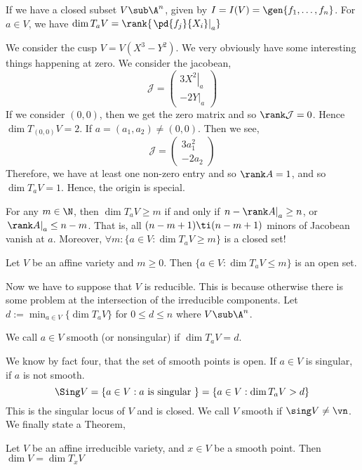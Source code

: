 \begin{fact}
  If we have a closed subset $V \sub \A^n$, given by $I = I(V) = \gen{f_1, \dots, f_n}$. For $a \in V$, we have $\dim T_aV = \rank{\left.\pd {f_j}{X_i}\right|_a}$
\end{fact}
We consider the cusp $V = V(X^3 - Y^2)$. We very obviously have some interesting things happening at zero. We consider the jacobean,
$$ \mathcal{J} = \begin{pmatrix}
  \left.3X^2\right|_a \\
  \left.-2Y\right|_a
\end{pmatrix} $$
If we consider $(0, 0)$, then we get the zero matrix and so $\rank \mathcal{J} = 0$. Hence $\dim T_{(0, 0)}V = 2$. If $a = (a_1, a_2) \ne (0, 0)$. Then we see,
$$ \mathcal{J} = \begin{pmatrix}
  3a_1^2 \\
  -2a_2
\end{pmatrix} $$
Therefore, we have at least one non-zero entry and so $\rank A = 1$, and so $\dim T_a V = 1$. Hence, the origin is special.

\begin{remark}
  For any $m \in \N$, then $\dim T_aV \ge m$ if and only if $\left.n - \rank A \right|_a \ge n$, or $\left.\rank A\right|_a \le n - m$. That is, all $(n - m + 1) \ti (n - m + 1)$ minors of Jacobean vanish at $a$. Moreover, $\forall m : \{a \in V : \dim T_aV \ge m\}$ is a closed set!
\end{remark}

\begin{fact}%
  Let $V$ be an affine variety and $m \ge 0$. Then $\{a \in V : \dim T_aV \le m\}$ is an open set.
\end{fact}

Now we have to suppose that $V$ is reducible. This is because otherwise there is some problem at the intersection of the irreducible components. Let $d := \min_{a \in V} \{\dim T_aV\}$ for $0 \le d \le n$ where $V \sub \A^n$.
\begin{ndefi}[Smooth]
  We call $a\in V$ smooth (or nonsingular) if $\dim T_aV = d$.
\end{ndefi}
We know by fact four, that the set of smooth points is open. If $a \in V$ is singular, if $a$ is not smooth.
$$ \Sing V = \{a \in V : a \text{ is singular }\} = \{a \in V : \dim T_a V > d\} $$
This is the singular locus of $V$ and is closed. We call $V$ smooth if $\sing V \ne \vn$. We finally state a Theorem,
\begin{nthm}
  Let $V$ be an affine irreducible variety, and $x \in V$ be a smooth point. Then $\dim V = \dim T_x V$
\end{nthm}